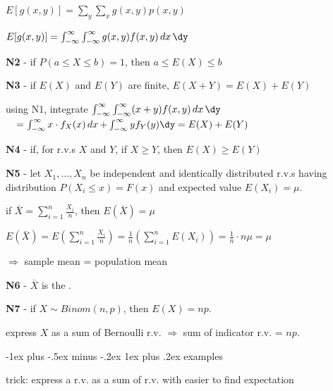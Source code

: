 \documentclass[10pt, landscape]{article}
\makeatletter
\renewcommand{\subsubsection}{\@startsection{subsubsection}{3}{0mm}%
  {-1ex plus -.5ex minus -.2ex}%
  {1ex plus .2ex}%
{\normalfont\small\bfseries}}%
\makeatother
\begin{document}
\begin{multicols*}{3}
\begin{center}
    $E[g(x, y)] = \sum\limits_y \sum\limits_x g(x, y) p(x, y)$

    $ E[g(x, y)] = \int^\infty_{-\infty} \int^\infty_{-\infty} g(x, y) f(x, y) \dx \dy $
  \end{center}

  \textbf{N2} - if $P(a \leq X \leq b) = 1$, then $a \leq E(X) \leq b$

  \textbf{N3} - if $E(X)$ and $E(Y)$ are finite, $E(X+Y) = E(X) + E(Y)$

  \begin{niceproof}
    using N1, integrate $\int^\infty_{-\infty} \int^\infty_{-\infty} (x+y) f(x, y) \dx \dy$
    $\quad = \int^\infty_{-\infty} x \cdot f_X (x) \dx + \int^\infty_{-\infty} y f_Y(y) \dy = E(X) + E(Y)$
  \end{niceproof}

  \textbf{N4} - if, for r.v.s $X$ and $Y$, if $X \geq Y$, then $E(X) \geq E(Y)$

  \textbf{N5} - let $X_1, \dots, X_n$ be independent and identically distributed r.v.s having distribution $P(X_i \leq x) = F(x)$ and expected value $E(X_i) = \mu$. 
  \begin{tightcenter}
    if $\bar{X} = \sum\limits^n_{i=1} \frac{X_i}{n}$, then $E(\bar{X}) = \mu$
  \end{tightcenter}

  \begin{niceproof}
    $E(\bar{X}) = E (\sum\limits^n_{i=1} \frac{X_i}{n}) = \frac{1}{n} (\sum\limits^n_{i=1} E(X_i)) = \frac{1}{n} \cdot n\mu = \mu $

    $\Rightarrow$ sample mean = population mean
  \end{niceproof}

  \textbf{N6} - $\bar{X}$ is the .

  \textbf{N7} - if $X \sim Binom(n, p)$, then $E(X) = np$.

  \begin{niceproof}
    express $X$ as a sum of Bernoulli r.v. $\Rightarrow$ sum of indicator r.v. = $np$.
  \end{niceproof}

  \subsubsection{examples}

  \attention trick: express a r.v. as a sum of r.v. with easier to find expectation


\end{multicols*}
\end{document}
